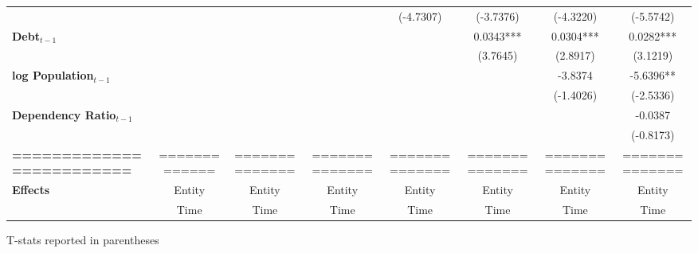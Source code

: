 \begin{center}
\begin{tabular}{lccccccc}
\textbf{ }                         &                   &                      &                           &     (-4.7307)      &    (-3.7376)    &         (-4.3220)         &          (-5.5742)            \\
\textbf{Debt$_{t-1}$}                &                   &                      &                           &                    &    0.0343***    &         0.0304***         &          0.0282***            \\
\textbf{ }                         &                   &                      &                           &                    &     (3.7645)    &          (2.8917)         &           (3.1219)            \\
\textbf{log Population$_{t-1}$}      &                   &                      &                           &                    &                 &          -3.8374          &          -5.6396**            \\
\textbf{ }                         &                   &                      &                           &                    &                 &         (-1.4026)         &          (-2.5336)            \\
\textbf{Dependency Ratio$_{t-1}$}   &                   &                      &                           &                    &                 &                           &           -0.0387             \\
\textbf{ }                         &                   &                      &                           &                    &                 &                           &          (-0.8173)            \\
\textbf{=========================} &   =============   &    ==============    &       ==============      &   ==============   &  ============== &       ==============      &        ==============         \\
\textbf{Effects}                   &       Entity      &        Entity        &           Entity          &       Entity       &      Entity     &           Entity          &            Entity             \\
\textbf{}                          &        Time       &         Time         &            Time           &        Time        &       Time      &            Time           &             Time              \\
\bottomrule
\end{tabular}
\end{center}

T-stats reported in parentheses